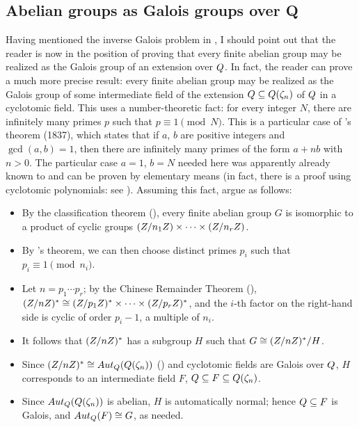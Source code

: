 \subsection{Abelian groups as Galois groups over Q}
\label{subsec:fields:abelian-groups-as-galois-groups-over-q}
Having mentioned the inverse Galois problem in
, I
should point out that the reader is now in the position of proving
that every finite abelian group may be realized as the Galois group of
an extension over $Q$.  In fact, the reader can prove a much more
precise result: every finite abelian group may be realized as the
Galois group of some intermediate field of the extension
$Q \subseteq Q(\zeta_n)$ of $Q$ in a cyclotomic field. This uses a
number-theoretic fact: for every integer $N$, there are infinitely
many primes $p$ such that $p \equiv 1 \pmod{N}$.  This is a particular
case of 's theorem (1837), which states that if $a$,
$b$ are positive integers and $\gcd(a, b) = 1$, then there are
infinitely many primes of the form $a + nb$ with $n > 0$. The
particular case $a = 1$, $b = N$ needed here was apparently already
known to  and can be proven by elementary means (in fact,
there is a proof using cyclotomic polynomials: see
). Assuming this
fact, argue as follows:
\begin{itemize}
\item By the classification theorem (), every
  finite abelian group $G$ is isomorphic to a product of cyclic groups
  $(Z/n_1Z) \times \dots \times (Z/n_rZ)$.
\item By 's theorem, we can then choose distinct
  primes $p_i$ such that $p_i \equiv 1 \pmod{n_i}$.
\item Let $n = p_1 \cdots p_r$; by the Chinese Remainder Theorem
  (),
  $(Z/nZ)^\ast \cong (Z/p_1Z)^\ast \times \dots \times
  (Z/p_rZ)^\ast$, and the $i$-th factor on the right-hand side is
  cyclic of order $p_i - 1$, a multiple of $n_i$.
\item It follows that $(Z/nZ)^\ast$ has a subgroup $H$ such that
  $G \cong (Z/nZ)^\ast / H$.
\item Since $(Z/nZ)^\ast \cong Aut_{Q}(Q(\zeta_n))$
  () and cyclotomic fields are Galois over
  $Q$, $H$ corresponds to an intermediate field $F$,
  $Q \subseteq F \subseteq Q(\zeta_n)$.
\item Since $Aut_{Q}(Q(\zeta_n))$ is abelian, $H$ is automatically
  normal; hence $Q \subseteq F$ is Galois, and
  $Aut_{Q}(F) \cong G$, as needed.
\end{itemize}
